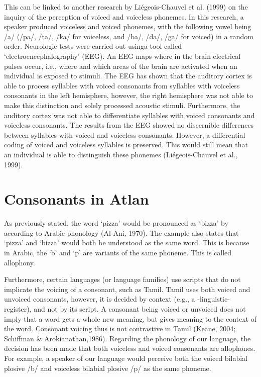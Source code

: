 This can be linked to another research by Liégeois-Chauvel et al. (1999) on the inquiry of the perception of voiced and voiceless phonemes. In this research, a speaker produced voiceless and voiced phonemes, with the following vowel being /a/ (/pa/, /ta/, /ka/ for voiceless, and /ba/, /da/, /ga/ for voiced) in a random order. Neurologic tests were carried out usinga tool called ‘electroencephalography’ (EEG). An EEG maps where in the brain electrical pulses occur, i.e., where and which areas of the brain are activated when an individual is exposed to stimuli. The EEG has shown that the auditory cortex is able to process syllables with voiced consonants from syllables with voiceless consonants in the left hemisphere, however, the right hemisphere was not able to make this distinction and solely processed acoustic stimuli. Furthermore, the auditory cortex was not able to differentiate syllables with voiced consonants and voiceless consonants. The results from the EEG showed no discernible differences between syllables with voiced and voiceless consonants. However, a differential coding of voiced and voiceless syllables is preserved. This would still mean that an individual is able to distinguish these phonemes (Liégeois-Chauvel et al., 1999).

\vspace{-0.2cm}
\section{Consonants in Atlan}
As previously stated, the word ‘pizza’ would be pronounced as ‘bizza’ by according to Arabic phonology (Al-Ani, 1970). The example also states that ‘pizza’ and ‘bizza’ would both be understood as the same word. This is because in Arabic, the ‘b’ and ‘p’ are variants of the same phoneme. This is called allophony. 

Furthermore, certain languages (or language families) use scripts that do not implicate the voicing of a consonant, such as Tamil. Tamil uses both voiced and unvoiced consonants, however, it is decided by context (e.g., a -linguistic- register), and not by its script. A consonant being voiced or unvoiced does not imply that a word gets a whole new meaning, but gives meaning to the context of the word. Consonant voicing thus is not contrastive in Tamil (Keane, 2004; Schiffman \& Arokianathan,1986). Regarding the phonology of our language, the decision has been made that both voiceless and voiced consonants are allophones. For example, a speaker of our language would perceive both the voiced bilabial plosive /b/ and voiceless bilabial plosive /p/ as the same phoneme.  

